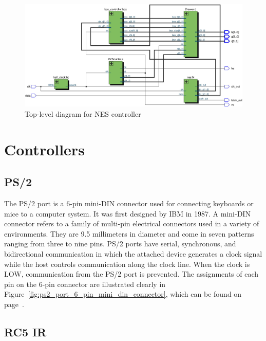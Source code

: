 \documentclass[12pt]{article}
\numberwithin{figure}{subsection}
\begin{document}
\begin{figure}
  \centering
  \includegraphics[width=\textwidth]{nes_top_level.jpg}
  \caption{Top-level diagram for NES controller}
  \label{fig:nes_top_level}
\end{figure}

\section{Controllers}

\subsection{PS/2}

The PS/2 port is a 6-pin mini-DIN connector used for connecting keyboards or mice to a computer system. It was first designed by IBM in 1987. A mini-DIN connector refers to a family of multi-pin electrical connectors used in a variety of environments. They are 9.5 millimeters in diameter and come in seven patterns ranging from three to nine pins. PS/2 ports have serial, synchronous, and bidirectional communication in which the attached device generates a clock signal while the host controls communication along the clock line. When the clock is LOW, communication from the PS/2 port is prevented. The assignments of each pin on the 6-pin connector are illustrated clearly in Figure~\ref{fig:ps2_port_6_pin_mini_din_connector}, which can be found on page~\pageref{fig:ps2_port_6_pin_mini_din_connector}.

\subsection{RC5 IR}
\end{document}
